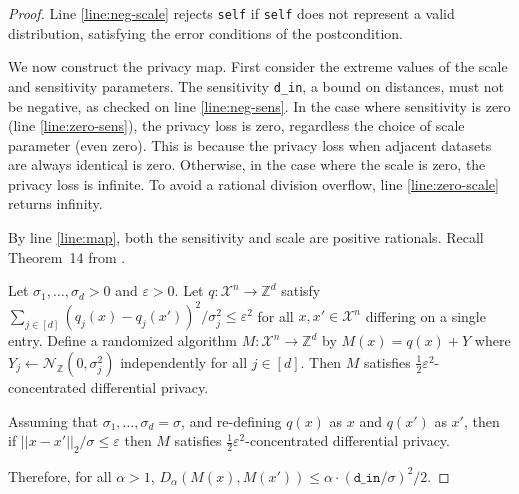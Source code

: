 \documentclass{article}
\begin{document}
\begin{proof}
    Line \ref{line:neg-scale} rejects \texttt{self} if \texttt{self} does not represent a valid distribution,
    satisfying the error conditions of the postcondition.

    We now construct the privacy map.
    First consider the extreme values of the scale and sensitivity parameters.
    The sensitivity \texttt{d\_in}, a bound on distances, must not be negative, as checked on line \ref{line:neg-sens}.
    In the case where sensitivity is zero (line \ref{line:zero-sens}), the privacy loss is zero, regardless the choice of scale parameter (even zero).
    This is because the privacy loss when adjacent datasets are always identical is zero.
    Otherwise, in the case where the scale is zero, the privacy loss is infinite.
    To avoid a rational division overflow, line \ref{line:zero-scale} returns infinity.

    By line \ref{line:map}, both the sensitivity and scale are positive rationals.
    Recall Theorem~14 from \cite{CKS20}.

    \begin{theorem}
        Let $\sigma_1, \ldots, \sigma_d > 0$ and $\varepsilon > 0$.
        Let $q: \mathcal{X}^n \rightarrow \mathbb{Z}^d$ satisfy $\sum_{j \in [d]} (q_j(x) - q_j(x'))^2 / \sigma^2_j \leq \varepsilon^2$
        for all $x, x' \in \mathcal{X}^n$ differing on a single entry.
        Define a randomized algorithm $M: \mathcal{X}^n \rightarrow \mathbb{Z}^d$ by $M(x) = q(x) + Y$ where $Y_j \leftarrow \mathcal{N}_\mathbb{Z}(0, \sigma^2_j)$
        independently for all $j \in [d]$.
        Then $M$ satisfies $\frac{1}{2}\varepsilon^2$-concentrated differential privacy.
    \end{theorem}

    Assuming that $\sigma_1, \ldots, \sigma_d = \sigma$, and re-defining $q(x)$ as $x$ and $q(x')$ as $x'$,
    then if $||x - x'||_2 / \sigma \leq \varepsilon$ then $M$ satisfies $\frac{1}{2}\varepsilon^2$-concentrated differential privacy.

    Therefore, for all $\alpha > 1$, $D_\alpha(M(x), M(x')) \leq \alpha \cdot (\texttt{d\_in} / \sigma)^2 / 2$.
\end{proof}



\end{document}
